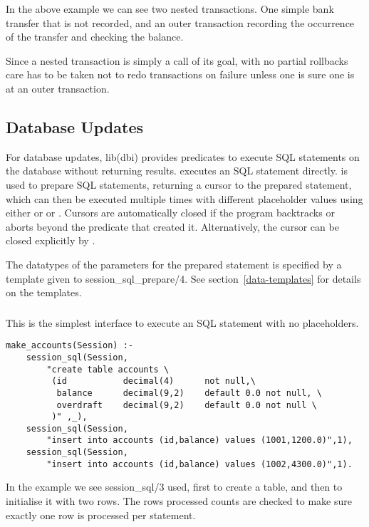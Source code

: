 In the above example we can see two nested transactions. One simple bank
transfer that is not recorded, and an outer transaction recording the
occurrence of the transfer and checking the balance.

Since a nested transaction is simply a call of its goal, with no
partial rollbacks care has to be taken not to redo transactions on
failure unless one is sure one is at an outer transaction.

\subsection{Database Updates}


For database updates, lib(dbi) provides predicates to execute SQL
statements on the database without returning results. 
 executes
an SQL statement directly.  is used to
prepare SQL statements, returning a cursor to the prepared statement,
which can then be executed
multiple times with different placeholder values using either
 or
 or
.
Cursors are automatically closed if the program backtracks or aborts beyond
the predicate that created it. Alternatively, the cursor can be closed
explicitly by .

The datatypes of the parameters for the prepared statement is specified by
a template given to session_sql_prepare/4. See section~\ref{data-templates}
for details on the templates.  

\subsubsection{}
\label{session-sql/3}

This is the simplest interface to execute an SQL statement with no
placeholders.

\begin{verbatim}
make_accounts(Session) :-
    session_sql(Session,
        "create table accounts \
         (id           decimal(4)      not null,\
          balance      decimal(9,2)    default 0.0 not null, \
          overdraft    decimal(9,2)    default 0.0 not null \
         )" ,_),
    session_sql(Session,
        "insert into accounts (id,balance) values (1001,1200.0)",1),
    session_sql(Session,
        "insert into accounts (id,balance) values (1002,4300.0)",1).
\end{verbatim}
In the example we see session_sql/3 used, first to create a
table, and then to initialise it with two rows. The rows processed counts
are checked to make sure exactly one row is processed per statement.

